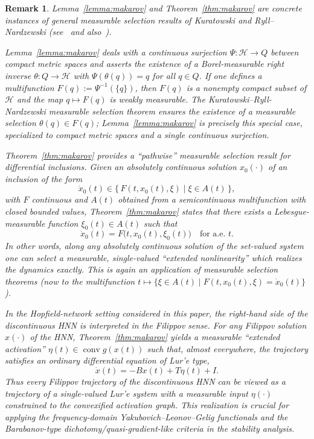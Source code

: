 \documentclass[journal]{IEEEtran}
\newtheorem{remark}{Remark}
\begin{document}
\begin{remark}%
Lemma~\ref{lemma:makarov} and Theorem~\ref{thm:makarov} are concrete instances of general measurable
selection results of Kuratowski and Ryll--Nardzewski
(see~\cite{kuratowski-ryll-nardzewski-1965} 
and also~\cite{wagner-1977-measurable-selection-survey,castaing-valadier-1977,srivastava-1998-borel-sets}).

Lemma~\ref{lemma:makarov} deals with a continuous surjection
$\Psi:\mathcal{H}\to Q$ between compact metric spaces and asserts the
existence of a Borel-measurable right inverse
$\theta:Q\to\mathcal{H}$ with $\Psi(\theta(q))=q$ for all $q\in Q$.
If one defines a multifunction $F(q):=\Psi^{-1}(\{q\})$, then
$F(q)$ is a nonempty compact subset of $\mathcal{H}$ and the map
$q\mapsto F(q)$ is weakly measurable. The Kuratowski--Ryll-Nardzewski
measurable selection theorem ensures the existence of a measurable
selection $\theta(q)\in F(q)$; 
Lemma~\ref{lemma:makarov} is precisely this special
case, specialized to compact metric spaces and a single continuous
surjection.

Theorem~\ref{thm:makarov} provides a ``pathwise'' measurable selection result
for differential inclusions. Given an absolutely continuous solution
$x_0(\cdot)$ of an inclusion of the form
\[
   \dot x_0(t) \in \{\,F(t,x_0(t),\xi)\mid \xi\in A(t)\,\},
\]
with $F$ continuous and $A(t)$ obtained from a semicontinuous
multifunction with closed bounded values, 
Theorem~\ref{thm:makarov} states that there
exists a Lebesgue-measurable function $\xi_0(t)\in A(t)$ such that
\[
   \dot x_0(t) = F\bigl(t,x_0(t),\xi_0(t)\bigr)
   \quad\text{for a.e. }t.
\]
In other words, along any absolutely continuous solution of the
set-valued system one can select a measurable, single-valued
``extended nonlinearity'' which realizes the dynamics exactly. This is
again an application of measurable selection theorems (now to the
multifunction
$t\mapsto\{\xi\in A(t)\mid F(t,x_0(t),\xi)=\dot x_0(t)\}$).

In the Hopfield-network setting considered in this paper, the
right-hand side of the discontinuous HNN is interpreted in the Filippov
sense. For any Filippov solution $x(\cdot)$ of the HNN, Theorem~\ref{thm:makarov}
yields a measurable ``extended activation''
$\eta(t)\in\operatorname{conv} g(x(t))$ such that, almost everywhere,
the trajectory satisfies an ordinary differential equation of Lur'e
type,
\[
   \dot x(t) = -B x(t) + T \eta(t) + I.
\]
Thus every Filippov trajectory of the discontinuous HNN can be viewed
as a trajectory of a single-valued Lur'e system with a measurable
input $\eta(\cdot)$ constrained to the convexified activation graph.
This realization is crucial for applying the frequency-domain
Yakubovich--Leonov--Gelig functionals and the Barabanov-type
dichotomy/quasi-gradient-like criteria in the stability analysis.
\end{remark}
\end{document}
